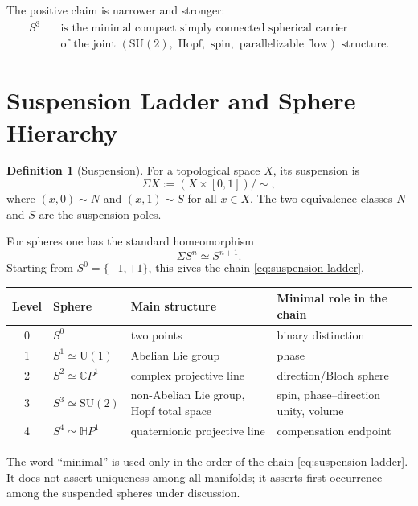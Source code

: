 \documentclass[11pt,a4paper]{article}
\theoremstyle{definition}
\newtheorem{definition}[theorem]{Definition}
\theoremstyle{remark}
\newcommand{\Sn}[1]{S^{#1}}
\newcommand{\Szero}{S^{0}}
\newcommand{\Sone}{S^{1}}
\newcommand{\Stwo}{S^{2}}
\newcommand{\Sthree}{S^{3}}
\newcommand{\Sfour}{S^{4}}
\newcommand{\CP}{\mathbb{C}P}
\newcommand{\HP}{\mathbb{H}P}
\newcommand{\SU}{\mathrm{SU}}
\newcommand{\U}{\mathrm{U}}
\begin{document}
The positive claim is narrower and stronger:
\[
\begin{aligned}
\Sthree\quad &\text{is the minimal compact simply connected spherical carrier}\\
&\text{of the joint }(\SU(2),\text{ Hopf},\text{ spin},\text{ parallelizable flow})
\text{ structure}.
\end{aligned}
\]

\section{Suspension Ladder and Sphere Hierarchy}

\begin{definition}[Suspension]
For a topological space $X$, its suspension is
\begin{equation}
\Sigma X := (X\times[0,1])/\sim,
\end{equation}
where $(x,0)\sim N$ and $(x,1)\sim S$ for all $x\in X$.  The two equivalence classes
$N$ and $S$ are the suspension poles.
\end{definition}

For spheres one has the standard homeomorphism
\begin{equation}
\Sigma \Sn{n}\simeq \Sn{n+1}.
\label{eq:sigma-sphere}
\end{equation}
Starting from $\Szero=\{-1,+1\}$, this gives the chain \eqref{eq:suspension-ladder}.

\begin{center}
\small
\begin{tabularx}{\textwidth}{@{}c l l X@{}}
\toprule
Level & Sphere & Main structure & Minimal role in the chain\\
\midrule
0 & $\Szero$ & two points & binary distinction\\
1 & $\Sone\simeq\U(1)$ & Abelian Lie group & phase\\
2 & $\Stwo\simeq\CP^{1}$ & complex projective line & direction/Bloch sphere\\
3 & $\Sthree\simeq\SU(2)$ & non-Abelian Lie group, Hopf total space & spin, phase--direction unity, volume\\
4 & $\Sfour\simeq\HP^{1}$ & quaternionic projective line & compensation endpoint\\
\bottomrule
\end{tabularx}
\end{center}


The word ``minimal'' is used only in the order of the chain \eqref{eq:suspension-ladder}.  It
does not assert uniqueness among all manifolds; it asserts first occurrence among the suspended
spheres under discussion.
\end{document}
